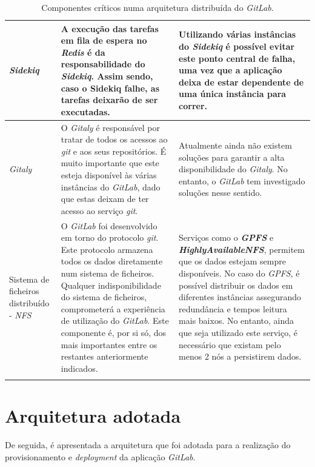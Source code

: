 \documentclass[12pt,a4paper]{article}
\begin{document}
\begin{center}
\begin{longtable}{|p{}|p{}|p{}|}
    \emph{Sidekiq} & A execução das tarefas em fila de espera no \emph{Redis} é da responsabilidade do \emph{Sidekiq}. Assim sendo, caso o Sidekiq falhe, as tarefas deixarão de ser executadas. & Utilizando várias instâncias do \emph{Sidekiq} é possível evitar este ponto central de falha, uma vez que a aplicação deixa de estar dependente de uma única instância para correr. \\ \hline 

    \emph{Gitaly} & O \emph{Gitaly} é responsável por tratar de todos os acessos ao \emph{git} e aos seus repositórios. É muito importante que este esteja disponível às várias instâncias do \emph{GitLab}, dado que estas deixam de ter acesso ao serviço \emph{git}. & Atualmente ainda não existem soluções para garantir a alta disponibilidade do \emph{Gitaly}. No entanto, o \emph{GitLab} tem investigado soluções nesse sentido. \\ \hline
    
    Sistema de ficheiros distribuído - \emph{NFS} & O \emph{GitLab} foi desenvolvido em torno do protocolo \emph{git}. Este protocolo armazena todos os dados diretamente num sistema de ficheiros. Qualquer indisponibilidade do sistema de ficheiros, comprometerá a experiência de utilização do \emph{GitLab}. Este componente é, por si só, dos mais importantes entre os restantes anteriormente indicados. & Serviços como o \textbf{\emph{GPFS}} e \textbf{\emph{HighlyAvailableNFS}}, permitem que os dados estejam sempre disponíveis. No caso do \emph{GPFS}, é possível distribuir os dados em diferentes instâncias assegurando redundância e tempos leitura mais baixos. No entanto, ainda que seja utilizado este serviço, é necessário que existam pelo menos 2 nós a persistirem dados.\\ \hline
    
\caption{Componentes críticos numa arquitetura distribuída do \emph{GitLab}.}
\end{longtable}
\normalsize
\end{center}





\newpage
\section{Arquitetura adotada}

De seguida, é apresentada a arquitetura que foi adotada para a realização do provisionamento e \emph{deployment} da aplicação \emph{GitLab}.
\end{document}
